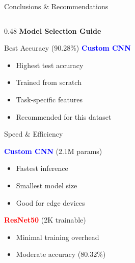 \documentclass[aspectratio=169]{beamer}
\begin{document}
\begin{frame}{Conclusions \& Recommendations}
    \vspace{-0.2cm}
 
    \begin{columns}[T]
        \begin{column}{0.48\textwidth}
            \textbf{Model Selection Guide}
            
            \vspace{-0.2cm}
            \begin{block}{Best Accuracy (90.28\%)}
                \textcolor{blue}{\textbf{Custom CNN}}
                \begin{itemize}
                    \scriptsize
                    \item Highest test accuracy
                    \item Trained from scratch
                    \item Task-specific features
                    \item Recommended for this dataset
                \end{itemize}
            \end{block}
            
            \vspace{-0.2cm}
            \begin{block}{Speed \& Efficiency}
               \vspace{-0.1cm}
 
                \textcolor{blue}{\textbf{Custom CNN}} (2.1M params)
                \begin{itemize}
                    \scriptsize
                    \item Fastest inference
                    \item Smallest model size
                    \item Good for edge devices
                \end{itemize}
                
                \textcolor{red}{\textbf{ResNet50}} (2K trainable)
                \begin{itemize}
                    \scriptsize
                    \item Minimal training overhead
                    \item Moderate accuracy (80.32\%)
                \end{itemize}
            \end{block}
        \end{column}
        

\end{columns}
\end{frame}
\end{document}
